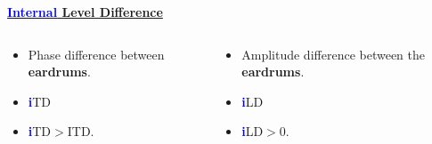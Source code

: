 \documentclass{beamer}
\begin{document}
\begin{frame}[t]
{\begin{exampleblock}{}
\begin{columns}
    \begin{column}{0.5\textwidth}
    \centering
    \underline{\textbf{\textcolor{blue}{Internal} Level Difference}}
    \end{column}
    
  \end{columns}
  
    \begin{columns}
 
    \begin{column}{0.5\textwidth}
    \small
     \begin{itemize}
    \item[] Phase difference between \textbf{eardrums}.
    \item \textbf{\textcolor{blue}{i}}TD
    \item \textbf{\textcolor{blue}{i}}TD$>$ITD.
     \end{itemize}
    \end{column}
     
    \begin{column}{0.5\textwidth}
    \small
     \begin{itemize}
          \item[] Amplitude difference between the \textbf{eardrums}.
          \item \textbf{\textcolor{blue}{i}}LD
          \item \textbf{\textcolor{blue}{i}}LD$>$0.
     \end{itemize}
    \end{column}
    
  \end{columns}
  \end{exampleblock}}
\end{frame}
  
\end{document}
